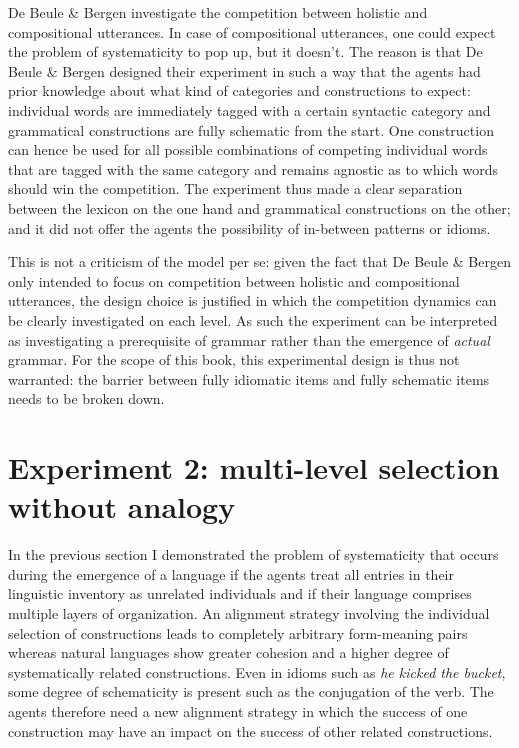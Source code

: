 De Beule \& Bergen investigate the competition between holistic and compositional utterances. In case of compositional utterances, one could expect the problem of systematicity to pop up, but it doesn't. The reason is that De Beule \& Bergen designed their experiment in such a way that the agents had prior knowledge about what kind of categories and constructions to expect: individual words are immediately tagged with a certain syntactic category and grammatical constructions are fully schematic from the start. One construction can hence be used for all possible combinations of competing individual words that are tagged with the same category and remains agnostic as to which words should win the competition. The experiment thus made a clear separation between the lexicon on the one hand and grammatical constructions on the other; and it did not offer the agents the possibility of in-between patterns or idioms.

This is not a criticism of the model per se: given the fact that De Beule \& Bergen only intended to focus on competition between holistic and compositional utterances, the design choice is justified in which the competition dynamics can be clearly investigated on each level. As such the experiment can be interpreted as investigating a prerequisite of grammar rather than the emergence of {\em actual} grammar. For the scope of this book, this experimental design is thus not warranted: the barrier between fully idiomatic items and fully schematic items needs to be broken down.

\section{Experiment 2: multi-level selection without analogy}
\label{s:pattern-exp-2}

In the previous section I demonstrated the problem of systematicity that occurs during the emergence of a language if the agents treat all entries in their linguistic inventory as unrelated individuals and if their language comprises multiple layers of organization. An alignment strategy involving the individual selection of constructions leads to completely arbitrary form-meaning pairs whereas natural languages show greater cohesion and a higher degree of systematically related constructions. Even in idioms such as {\em he kicked the bucket}, some degree of schematicity is present such as the conjugation of the verb. The agents therefore need a new alignment strategy in which the success of one construction may have an impact on the success of other related constructions.


